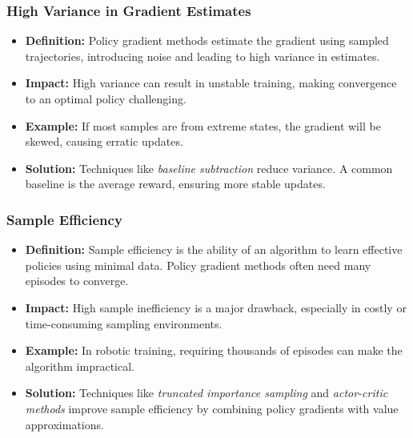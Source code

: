 \documentclass[aspectratio=169]{beamer}
\begin{document}
\begin{frame}[fragile]
    \frametitle{High Variance in Gradient Estimates}
    \begin{itemize}
        \item \textbf{Definition:} 
            Policy gradient methods estimate the gradient using sampled trajectories, introducing noise and leading to high variance in estimates.
            
        \item \textbf{Impact:} 
            High variance can result in unstable training, making convergence to an optimal policy challenging.
            
        \item \textbf{Example:} 
            If most samples are from extreme states, the gradient will be skewed, causing erratic updates.
            
        \item \textbf{Solution:} 
            Techniques like \textit{baseline subtraction} reduce variance. A common baseline is the average reward, ensuring more stable updates.
    \end{itemize}
\end{frame}

\begin{frame}[fragile]
    \frametitle{Sample Efficiency}
    \begin{itemize}
        \item \textbf{Definition:} 
            Sample efficiency is the ability of an algorithm to learn effective policies using minimal data. Policy gradient methods often need many episodes to converge.
            
        \item \textbf{Impact:} 
            High sample inefficiency is a major drawback, especially in costly or time-consuming sampling environments.
            
        \item \textbf{Example:} 
            In robotic training, requiring thousands of episodes can make the algorithm impractical.
            
        \item \textbf{Solution:} 
            Techniques like \textit{truncated importance sampling} and \textit{actor-critic methods} improve sample efficiency by combining policy gradients with value approximations.
    \end{itemize}
\end{frame}
\end{document}
